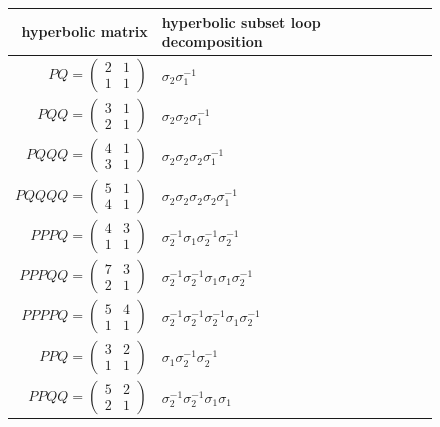 \documentclass[12pt,twoside]{reedthesis}
\theoremstyle{definition}
\begin{document}
\begin{figure}[p]
  \centering
  \begin{tabular}{r l}
   hyperbolic matrix & hyperbolic subset loop decomposition \\
   \toprule
   $PQ = \begin{pmatrix}2 & 1 \\ 1 & 1\end{pmatrix}$ & $\sigma_2 \sigma_1^{-1}$ \\[1em]
   $PQQ = \begin{pmatrix}3 & 1 \\ 2 & 1\end{pmatrix}$ & $\sigma_2 \sigma_2 \sigma_1^{-1}$ \\[1em]
   $PQQQ = \begin{pmatrix}4 & 1 \\ 3 & 1\end{pmatrix}$ & $\sigma_2 \sigma_2 \sigma_2 \sigma_1^{-1}$ \\[1em]
   $PQQQQ = \begin{pmatrix}5 & 1 \\ 4 & 1\end{pmatrix}$ & $\sigma_2 \sigma_2 \sigma_2 \sigma_2 \sigma_1^{-1}$ \\[1em]
   $PPPQ = \begin{pmatrix}4 & 3 \\ 1 & 1\end{pmatrix}$ & $\sigma_2^{-1} \sigma_1 \sigma_2^{-1} \sigma_2^{-1}$ \\[1em]
   $PPPQQ = \begin{pmatrix}7 & 3 \\ 2 & 1\end{pmatrix}$ & $\sigma_2^{-1} \sigma_2^{-1} \sigma_1 \sigma_1 \sigma_2^{-1}$ \\[1em]
   $PPPPQ = \begin{pmatrix}5 & 4 \\ 1 & 1\end{pmatrix}$ & $\sigma_2^{-1} \sigma_2^{-1} \sigma_2^{-1} \sigma_1 \sigma_2^{-1}$ \\[1em]
   $PPQ = \begin{pmatrix}3 & 2 \\ 1 & 1\end{pmatrix}$ & $\sigma_1 \sigma_2^{-1} \sigma_2^{-1}$ \\[1em]
   $PPQQ = \begin{pmatrix}5 & 2 \\ 2 & 1\end{pmatrix}$ & $\sigma_2^{-1} \sigma_2^{-1} \sigma_1 \sigma_1$ \\[1em]

\end{tabular}
\end{figure}
\end{document}
